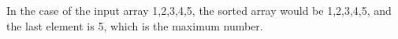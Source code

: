 \documentclass[preview]{standalone}
\begin{document}
In the case of the input array 1,2,3,4,5, the sorted array would be 1,2,3,4,5, and the last element is 5, which is the maximum number.\\
\end{document}
